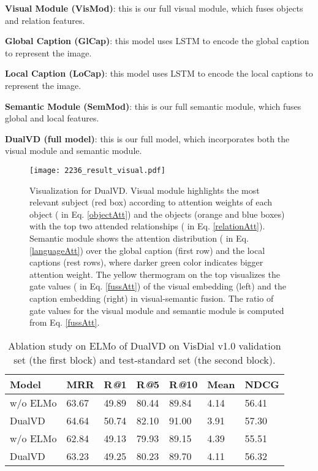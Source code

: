 \documentclass[letterpaper]{article} \usepackage{aaai20}  \usepackage{times}  \usepackage{helvet} \usepackage{courier}  \usepackage[hyphens]{url}  \usepackage{graphicx} \urlstyle{rm} \def\UrlFont{\rm}  \usepackage{graphicx}  \frenchspacing  \setlength{\pdfpagewidth}{8.5in}  \setlength{\pdfpageheight}{11in}  \usepackage{mathrsfs} \usepackage{amsfonts,amssymb}  \usepackage{tabularx} \usepackage{url}
\begin{document}
\textbf{Visual Module (VisMod)}: this is our full visual module, which fuses objects and relation features. 

\textbf{Global Caption (GlCap)}: this model uses LSTM to encode the global caption to represent the image. 

\textbf{Local Caption (LoCap)}: this model uses LSTM to encode the local captions to represent the image. 

\textbf{Semantic Module (SemMod)}: this is our full semantic module, which fuses global and local features. 

\textbf{DualVD (full model)}: this is our full model, which incorporates both the visual module and semantic module.









\begin{figure*}[t]
\centering
\texttt{[image: 2236\_result\_visual.pdf]} \caption{Visualization for DualVD. Visual module highlights the most relevant subject (red box) according to attention weights of each object ( in Eq. \ref{objectAtt}) and the objects (orange and blue boxes) with the top two attended relationships ( in Eq. \ref{relationAtt}). Semantic module shows the attention distribution ( in Eq. \ref{languageAtt}) over the global caption (first row) and the local captions (rest rows), where darker green color indicates bigger attention weight. The yellow thermogram on the top
visualizes the gate values ( in Eq. \ref{fussAtt}) of the visual embedding (left) and the caption embedding (right) in visual-semantic fusion. The ratio of gate values for the visual module and semantic module is computed from Eq. \ref{fussAtt}.}


\label{result_visual}
\end{figure*}


\iffalse
\begin{table}[t] 
\caption{Ablation study on ELMo of DualVD on VisDial v1.0 validation set (the first block) and test-standard set (the second block). }
\label{elmo_ab}
\begin{tabular}{L{1.8cm}C{0.6cm}C{0.6cm}C{0.6cm}C{0.69cm}C{0.6cm}C{0.77cm}}\hline                       
Model & MRR & R\textsl{@}1 & R\textsl{@}5 & R\textsl{@}10 & Mean & NDCG  \\
\hline  
w/o ELMo &63.67&49.89&80.44&89.84&4.14&56.41\\
DualVD& 64.64 & 50.74 & 82.10 & 91.00 & 3.91 & 57.30\\
\hline 
w/o ELMo  &62.84 & 49.13 & 79.93 & 89.15 & 4.39& 55.51\\
DualVD & 63.23 & 49.25 & 80.23 & 89.70 & 4.11 & 56.32\\

\hline  
\end{tabular}  
\end{table} 
\end{document}
